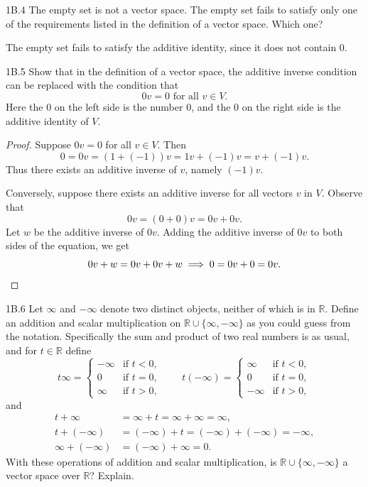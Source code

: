 \documentclass{exam}
\begin{document}
\begin{problem}{1B.4}
    The empty set is not a vector space. The empty set fails to satisfy only one of the requirements listed in the definition of a vector space. Which one?
\end{problem}
The empty set fails to satisfy the additive identity, since it does not contain $0$.

\begin{problem}{1B.5}
    Show that in the definition of a vector space, the additive inverse condition can be replaced with the condition that $$0v = 0\text{ for all }v\in V.$$ Here the $0$ on the left side is the number $0$, and the $0$ on the right side is the additive identity of $V$.
\end{problem}

\begin{proof}
    Suppose $0v = 0$ for all $v\in V$. Then \[
        0 = 0v = (1 + (-1))v = 1v + (-1)v = v + (-1)v.
    \]
    Thus there exists an additive inverse of $v$, namely $(-1)v$.
    
    Conversely, suppose there exists an additive inverse for all vectors $v$ in $V$. Observe that \[
        0v = (0 + 0)v = 0v + 0v.
    \]
    Let $w$ be the additive inverse of $0v$. Adding the additive inverse of $0v$ to both sides of the equation, we get \[
        0v + w = 0v + 0v + w \implies 0 = 0v + 0 = 0v.\qedhere
    \]
\end{proof}

\begin{problem}{1B.6}
    Let $\infty$ and $-\infty$ denote two distinct objects, neither of which is in $\mathbb R$. Define an addition and scalar multiplication on $\mathbb R\cup\{\infty,-\infty\}$ as you could guess from the notation. Specifically the sum and product of two real numbers is as usual, and for $t\in\mathbb R$ define \[
            t\infty=\begin{cases}-\infty & \text{if } t < 0,\\0 & \text{if }t = 0,\\\infty & \text{if } t > 0,\end{cases} \qquad t(-\infty)=\begin{cases}\infty & \text{if } t < 0,\\0 & \text{if }t = 0,\\-\infty & \text{if } t > 0,\end{cases}
    \]
    and
    \begin{align*}
        t + \infty &= \infty + t = \infty + \infty = \infty,\\
        t + (-\infty) &= (-\infty) + t = (-\infty) + (-\infty) = -\infty,\\
        \infty + (-\infty) &= (-\infty) + \infty = 0.
    \end{align*}
    With these operations of addition and scalar multiplication, is $\mathbb R\cup\{\infty,-\infty\}$ a vector space over $\mathbb R$? Explain.
\end{problem}
\end{document}
